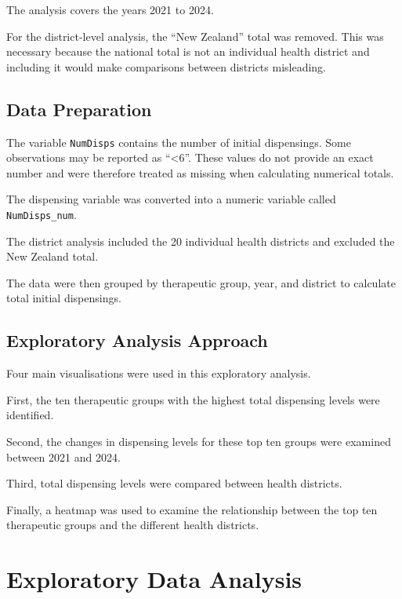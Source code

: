 \documentclass[11pt,a4paper]{report}
\begin{document}
The analysis covers the years 2021 to 2024.

For the district-level analysis, the ``New Zealand'' total was removed. This was necessary because the national total is not an individual health district and including it would make comparisons between districts misleading.

\section{Data Preparation}

The variable \texttt{NumDisps} contains the number of initial dispensings. Some observations may be reported as ``<6''. These values do not provide an exact number and were therefore treated as missing when calculating numerical totals.

The dispensing variable was converted into a numeric variable called \texttt{NumDisps\_num}.

The district analysis included the 20 individual health districts and excluded the New Zealand total.

The data were then grouped by therapeutic group, year, and district to calculate total initial dispensings.

\section{Exploratory Analysis Approach}

Four main visualisations were used in this exploratory analysis.

First, the ten therapeutic groups with the highest total dispensing levels were identified.

Second, the changes in dispensing levels for these top ten groups were examined between 2021 and 2024.

Third, total dispensing levels were compared between health districts.

Finally, a heatmap was used to examine the relationship between the top ten therapeutic groups and the different health districts.



\chapter{Exploratory Data Analysis}
\end{document}
